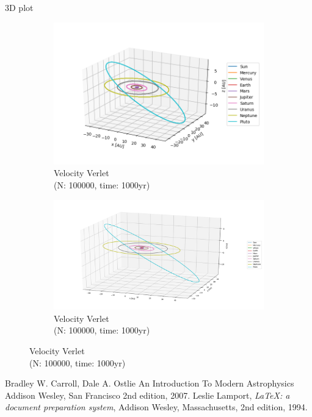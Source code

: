 \documentclass{article}
\begin{document}
3D plot
\begin{figure}[H]
  \centering
  \begin{subfigure}{0.5\textwidth}
    \centering
    \includegraphics[width=1.0\textwidth]{plots/allplanets3D.png}
    \caption{Velocity Verlet \\(N: 100000, time: 1000yr)}
  \end{subfigure}%
    \begin{subfigure}{0.5\textwidth}
    \centering
    \includegraphics[width=1.0\textwidth]{plots/allplanets3Dbig.png}
    \caption{Velocity Verlet \\(N: 100000, time: 1000yr)}
  \end{subfigure}
\end{figure}
\begin{thebibliography}{9}
  Bradley W. Carroll, Dale A. Ostlie
  An Introduction To Modern Astrophysics
  Addison Wesley, San Francisco
  2nd edition,
  2007.
  Leslie Lamport,
  \textit{\LaTeX: a document preparation system},
  Addison Wesley, Massachusetts,
  2nd edition,
  1994.
\end{thebibliography}
\end{document}
